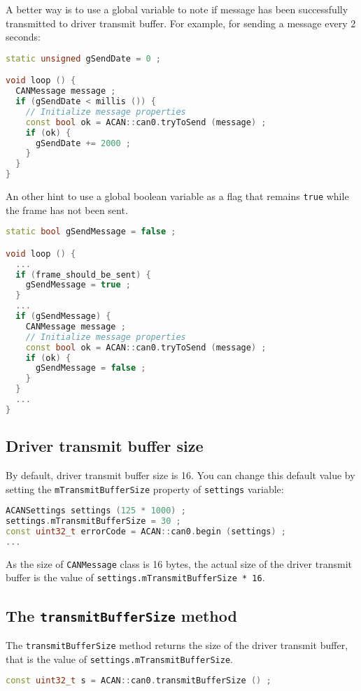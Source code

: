 \documentclass[10pt, a4paper, obeyspaces, openany]{extarticle}
\newcommand \subsectionLabel[2]{\subsection{#1}\label{subsec:#2}}
\begin{document}
A better way is to use a global variable to note if  message has been successfully transmitted to driver transmit buffer. For example, for sending a message every 2 seconds: 

{ \small
  \begin{lstlisting}[language=c++]
static unsigned gSendDate = 0 ;

void loop () {
  CANMessage message ;
  if (gSendDate < millis ()) {
    // Initialize message properties
    const bool ok = ACAN::can0.tryToSend (message) ;
    if (ok) {
      gSendDate += 2000 ;
    }
  }
}
  \end{lstlisting}
}

An other hint to use a global boolean variable as a flag that remains \texttt{true} while the frame has not been sent.

{ \small
  \begin{lstlisting}[language=c++]
static bool gSendMessage = false ;

void loop () {
  ...
  if (frame_should_be_sent) {
    gSendMessage = true ;
  }
  ...
  if (gSendMessage) {
    CANMessage message ;
    // Initialize message properties
    const bool ok = ACAN::can0.tryToSend (message) ;
    if (ok) {
      gSendMessage = false ;
    }
  }
  ...
}
  \end{lstlisting}
}


\subsectionLabel{Driver transmit buffer size}{driverTransmitBufferSize}

By default, driver transmit buffer size is 16. You can change this default value by setting the \texttt{mTransmitBufferSize} property of \texttt{settings} variable:

{ \small\begin{lstlisting}[language=c++]
ACANSettings settings (125 * 1000) ;
settings.mTransmitBufferSize = 30 ;
const uint32_t errorCode = ACAN::can0.begin (settings) ;
...
\end{lstlisting}}

As the size of \texttt{CANMessage} class is 16 bytes, the actual size of the driver transmit buffer is the value of \texttt{settings.mTransmitBufferSize * 16}.


\subsection{The \texttt{transmitBufferSize} method}

The \texttt{transmitBufferSize} method returns the size of the driver transmit buffer, that is the value of \texttt{settings.mTransmitBufferSize}.
{ \small\begin{lstlisting}[language=c++]
const uint32_t s = ACAN::can0.transmitBufferSize () ;
\end{lstlisting}}
\end{document}
